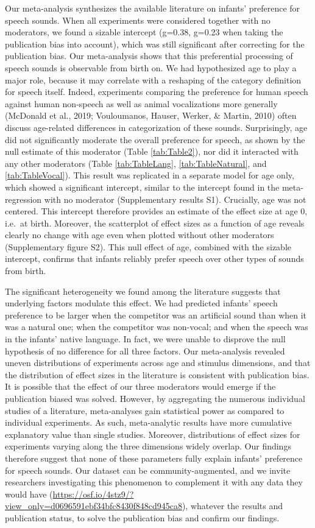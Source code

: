 \documentclass[
  english,
  man]{apa6}
\begin{document}
Our meta-analysis synthesizes the available literature on infants' preference for speech sounds. When all experiments were considered together with no moderators, we found a sizable intercept (g=0.38, g=0.23 when taking the publication bias into account), which was still significant after correcting for the publication bias. Our meta-analysis shows that this preferential processing of speech sounds is observable from birth on. We had hypothesized age to play a major role, because it may correlate with a reshaping of the category definition for speech itself. Indeed, experiments comparing the preference for human speech against human non-speech as well as animal vocalizations more generally (McDonald et al., 2019; Vouloumanos, Hauser, Werker, \& Martin, 2010) often discuss age-related differences in categorization of these sounds. Surprisingly, age did not significantly moderate the overall preference for speech, as shown by the null estimate of this moderator (Table \ref{tab:Table2}), nor did it interacted with any other moderators (Table \ref{tab:TableLang}, \ref{tab:TableNatural}, and \ref{tab:TableVocal}). This result was replicated in a separate model for age only, which showed a significant intercept, similar to the intercept found in the meta-regression with no moderator (Supplementary results S1). Crucially, age was not centered. This intercept therefore provides an estimate of the effect size at age 0, i.e.~at birth. Moreover, the scatterplot of effect sizes as a function of age reveals clearly no change with age even when plotted without other moderators (Supplementary figure S2). This null effect of age, combined with the sizable intercept, confirms that infants reliably prefer speech over other types of sounds from birth.

The significant heterogeneity we found among the literature suggests that underlying factors modulate this effect. We had predicted infants' speech preference to be larger when the competitor was an artificial sound than when it was a natural one; when the competitor was non-vocal; and when the speech was in the infants' native language. In fact, we were unable to disprove the null hypothesis of no difference for all three factors. Our meta-analysis revealed uneven distributions of experiments across age and stimulus dimensions, and that the distribution of effect sizes in the literature is consistent with publication bias. It is possible that the effect of our three moderators would emerge if the publication biased was solved. However, by aggregating the numerous individual studies of a literature, meta-analyses gain statistical power as compared to individual experiments. As such, meta-analytic results have more cumulative explanatory value than single studies. Moreover, distributions of effect sizes for experiments varying along the three dimensions widely overlap. Our findings therefore suggest that none of these parameters fully explain infants' preference for speech sounds. Our dataset can be community-augmented, and we invite researchers investigating this phenomenon to complement it with any data they would have (\url{https://osf.io/4stz9/?view_only=d0696591ebf34bfc8430f848cd945ca8}), whatever the results and publication status, to solve the publication bias and confirm our findings.
\end{document}
